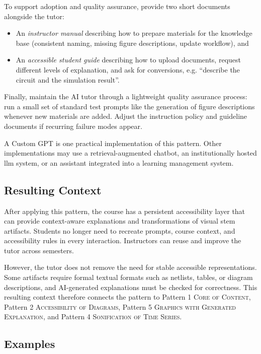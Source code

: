To support adoption and quality assurance, provide two short documents alongside the tutor:
\begin{itemize}
    \item An \textit{instructor manual} describing how to prepare materials for the knowledge base (consistent naming, missing figure descriptions, update workflow), and
    \item An \textit{accessible student guide} describing how to upload documents, request different levels of explanation, and ask for conversions, e.g. ``describe the circuit and the simulation result''.
\end{itemize}

Finally, maintain the AI tutor through a lightweight quality assurance process:  run a small set of standard test prompts like the generation of figure descriptions whenever new materials are added. Adjust the instruction policy and guideline documents if recurring failure modes appear.

A Custom GPT is one practical implementation of this pattern. Other implementations may use a retrieval-augmented chatbot, an institutionally hosted \ac{llm} system, or an assistant integrated into a learning management system.

\subsection*{Resulting Context}

After applying this pattern, the course has a persistent accessibility layer that can provide context-aware explanations and transformations of visual \ac{stem} artifacts. Students no longer need to recreate prompts, course context, and accessibility rules in every interaction. Instructors can reuse and improve the tutor across semesters.

However, the tutor does not remove the need for stable accessible representations. Some artifacts require formal textual formats such as netlists, tables, or diagram descriptions, and AI-generated explanations must be checked for correctness. This resulting context therefore connects the pattern to Pattern 1 \textsc{Core of Content}, Pattern 2 \textsc{Accessibility of Diagrams}, Pattern 5 \textsc{Graphics with Generated Explanation}, and Pattern 4 \textsc{Sonification of Time Series}.

\subsection*{Examples}

